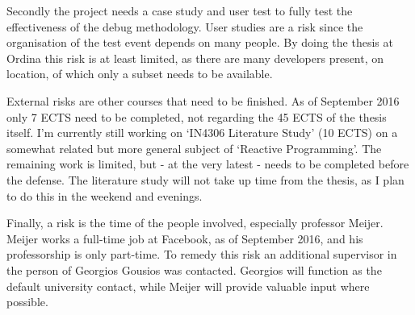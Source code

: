 \documentclass[11pt,a4paper]{article}
\begin{document}
Secondly the project needs a case study and user test to fully test the effectiveness of the debug methodology. User studies are a risk since the organisation of the test event depends on many people. By doing the thesis at Ordina this risk is at least limited, as there are many developers present, on location, of which only a subset needs to be available. 

External risks are other courses that need to be finished. As of September 2016 only 7 ECTS need to be completed, not regarding the 45 ECTS of the thesis itself. I'm currently still working on `IN4306 Literature Study' (10 ECTS) on a somewhat related but more general subject of `Reactive Programming'. The remaining work is limited, but - at the very latest - needs to be completed before the defense. The literature study will not take up time from the thesis, as I plan to do this in the weekend and evenings.

Finally, a risk is the time of the people involved, especially professor Meijer. Meijer works a full-time job at Facebook, as of September 2016, and his professorship is only part-time. To remedy this risk an additional supervisor in the person of Georgios Gousios was contacted. Georgios will function as the default university contact, while Meijer will provide valuable input where possible.

{}


%
%
%
%
%
%
\end{document}
